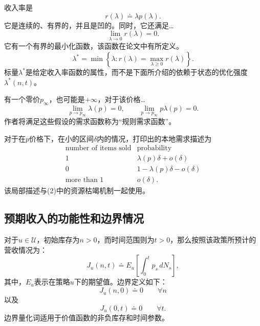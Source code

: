 \documentclass{article}
\begin{document}
收入率是
\begin{equation}
r(\lambda)\doteq\lambda p(\lambda).
\tag{1}
\end{equation}
它是连续的、有界的，并且是凹的。同时，它还满足…
\[
\lim_{\lambda\to0}r(\lambda)=0.
\]
它有一个有界的最小化函数，该函数在论文中有所定义。
\[
\lambda^*=\min\left\{\lambda:
 r(\lambda)=\max_{\lambda\geq0}r(\lambda)\right\}.
\]
标量$\lambda^*$是给定收入率函数的属性，而不是下面所介绍的依赖于状态的优化强度$\lambda^*(n,t)$。

有一个零价$p_\infty$，也可能是$+\infty$，对于该价格…
\[
\lim_{p\to p_\infty}\lambda(p)=0,
\qquad
\lim_{p\to p_\infty}p\lambda(p)=0.
\]
作者将满足这些假设的需求函数称为“规则需求函数”。

对于在$p$价格下，在小的区间$\delta$内的情况，打印出的本地需求描述为
\[
\begin{array}{c|c}
\text{number of items sold}&\text{probability}\\ \hline
1&\lambda(p)\delta+o(\delta)\\
0&1-\lambda(p)\delta-o(\delta)\\
\text{more than }1&o(\delta).
\end{array}
\]
该局部描述与(2)中的资源枯竭机制一起使用。

\subsection*{预期收入的功能性和边界情况}
对于$u\in\mathcal U$，初始库存为$n>0$，而时间范围则为$t>0$，那么按照该政策所预计的营收情况为：
\begin{equation}
J_u(n,t)\doteq E_u\left[\int_0^t p_s\,dN_s\right],
\tag{4}
\end{equation}
其中，$E_u$表示在策略$u$下的期望值。边界定义如下：
\begin{equation}
J_u(n,0)\doteq0\qquad\forall n
\tag{5}
\end{equation}
以及
\begin{equation}
J_u(0,t)\doteq0\qquad\forall t.
\tag{6}
\end{equation}
边界量化词适用于价值函数的非负库存和时间参数。
\end{document}
